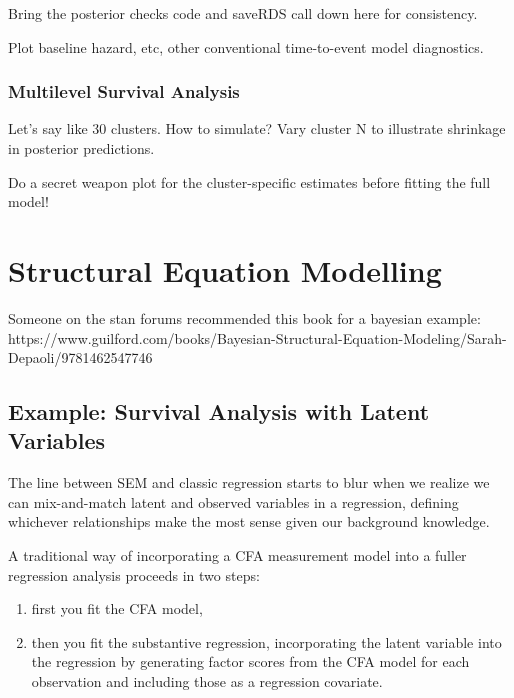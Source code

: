 \documentclass[
  letterpaper,
  DIV=11,
  numbers=noendperiod]{scrreprt}
\providecommand{\tightlist}{%
  \setlength{\itemsep}{0pt}\setlength{\parskip}{0pt}}\usepackage{longtable,booktabs,array}
\begin{document}
Bring the posterior checks code and saveRDS call down here for
consistency.

Plot baseline hazard, etc, other conventional time-to-event model
diagnostics.

\hypertarget{multilevel-survival-analysis}{%
\section{Multilevel Survival
Analysis}\label{multilevel-survival-analysis}}

Let's say like 30 clusters. How to simulate? Vary cluster N to
illustrate shrinkage in posterior predictions.

Do a secret weapon plot for the cluster-specific estimates before
fitting the full model!

\part{Structural Equation Modelling}

Someone on the stan forums recommended this book for a bayesian example:
https://www.guilford.com/books/Bayesian-Structural-Equation-Modeling/Sarah-Depaoli/9781462547746

\hypertarget{example-survival-analysis-with-latent-variables}{%
\chapter{Example: Survival Analysis with Latent
Variables}\label{example-survival-analysis-with-latent-variables}}

The line between SEM and classic regression starts to blur when we
realize we can mix-and-match latent and observed variables in a
regression, defining whichever relationships make the most sense given
our background knowledge.

A traditional way of incorporating a CFA measurement model into a fuller
regression analysis proceeds in two steps:

\begin{enumerate}
\def\labelenumi{\arabic{enumi}.}
\tightlist
\item
  first you fit the CFA model,
\item
  then you fit the substantive regression, incorporating the latent
  variable into the regression by generating factor scores from the CFA
  model for each observation and including those as a regression
  covariate.
\end{enumerate}
\end{document}
